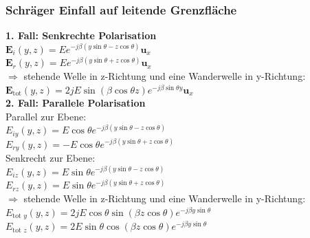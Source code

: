 \documentclass[english]{latex4ei/latex4ei_sheet}
\begin{document}
\begin{sectionbox}
	\subsubsection{Schräger Einfall auf leitende Grenzfläche}
	\textbf{1. Fall: Senkrechte Polarisation}\\
	$\mathbf{E}_i(y,z) = Ee^{-j\beta (y\sin{\theta} - z\cos{\theta} )}\mathbf{u}_x$\\
	$\mathbf{E}_r(y,z) = Ee^{-j\beta (y\sin{\theta} + z\cos{\theta} )}\mathbf{u}_x$\\
	$\Rightarrow$ stehende Welle in z-Richtung und eine Wanderwelle in y-Richtung:\\
	$\mathbf{E}_{\text{tot}}(y,z) = 2jE\sin{(\beta\cos{\theta} z )}e^{-j \beta\sin{\theta} y }\mathbf{u}_x$\\
	\textbf{2. Fall: Parallele Polarisation}\\
	Parallel zur Ebene:\\
	$E_{i y}(y,z) = E \cos{\theta}e^{-j\beta(y\sin{\theta}-z\cos{\theta})}$\\
	$E_{r y}(y, z)=-E \cos \theta e^{-j \beta(y \sin \theta+z \cos \theta)}$\\
	Senkrecht zur Ebene:\\
	$E_{i z}(y, z)=E \sin \theta e^{-j \beta(y \sin \theta-z \cos \theta)}$\\
	$E_{r z}(y, z)=E \sin \theta e^{-j \beta(y \sin \theta+z \cos \theta)}$\\
	$\Rightarrow$ stehende Welle in z-Richtung und eine Wanderwelle in y-Richtung:\\
	$E_{\text {tot } y}(y, z)=2 j E \cos \theta \sin (\beta z \cos \theta) e^{-j \beta y \sin \theta}$ \\
	$E_{\text {tot } z}(y, z)=2 E \sin \theta \cos (\beta z \cos \theta) e^{-j \beta y \sin \theta}$
\end{sectionbox}
\end{document}
